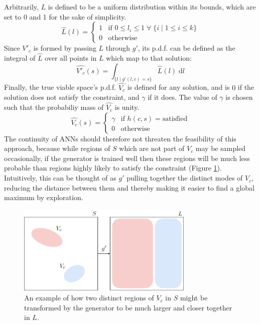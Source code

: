 \documentclass[../../main.tex]{subfiles}
\begin{document}
Arbitrarily, $L$ is defined to be a uniform distribution within its bounds, which are set to 0 and 1 for the sake of simplicity.
\begin{equation}
	\hat{L}(l)=\left\{\begin{array}{ll}1&\mbox{if }0\le l_i\le1\;\forall\;\{i\;|\;1\le i\le k\}\\0&\mbox{otherwise}\end{array}\right.
\end{equation}
Since $V'_c$ is formed by passing $L$ through $g'$, its p.d.f. can be defined as the integral of $\hat{L}$ over all points in $L$ which map to that solution:
\begin{equation}
	\hat{V'_c}(s)=\int_{\{l\;|\;g'(l,c)=s\}}\hat{L}(l)\;\mathrm{d}l
\end{equation}
Finally, the true viable space's p.d.f. $\hat{V_c}$ is defined for any solution, and is $0$ if the solution does not satisfy the constraint, and $\gamma$ if it does.
The value of $\gamma$ is chosen such that the probabiliy mass of $\hat{V_c}$ is unity.
\begin{equation}
	\hat{V_c}(s)=\left\{\begin{array}{ll}\gamma&\mbox{if }h(c,s)=\text{satisfied}\\0&\mbox{otherwise}\end{array}\right.
\end{equation}
The continuity of ANNs should therefore not threaten the feasibility of this approach, because while regions of $S$ which are not part of $V_c$ may be sampled occasionally, if the generator is trained well then these regions will be much less probable than regions highly likely to satisfy the constraint (Figure \ref{fig:exampleMapping}).
Intuitively, this can be thought of as $g'$ pulling together the distinct modes of $V_c$, reducing the distance between them and thereby making it easier to find a global maximum by exploration.
\begin{figure}[H]
    \begin{center}
    \includegraphics[width=0.75\textwidth]{exampleMapping}
    \caption{
		An example of how two distinct regions of $V_c$ in $S$ might be transformed by the generator to be much larger and closer together in $L$. 
    }
    \label{fig:exampleMapping}
    \end{center}
\end{figure}
\end{document}
